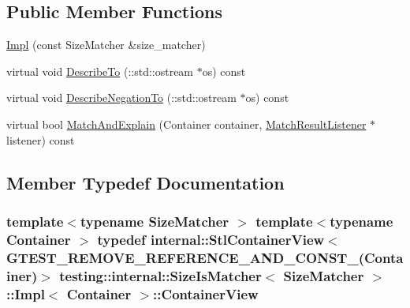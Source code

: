 \subsection*{Public Member Functions}
\begin{DoxyCompactItemize}
\item 
\hyperlink{classtesting_1_1internal_1_1SizeIsMatcher_1_1Impl_aa5279c8598ec8982546350fb442223f3}{Impl} (const Size\+Matcher \&size\+\_\+matcher)
\item 
virtual void \hyperlink{classtesting_1_1internal_1_1SizeIsMatcher_1_1Impl_a2d09318bced4fd9adf951009d81a97ff}{Describe\+To} (\+::std\+::ostream $\ast$os) const 
\item 
virtual void \hyperlink{classtesting_1_1internal_1_1SizeIsMatcher_1_1Impl_adb77690cb058ea5e2f56bb1ddcba0289}{Describe\+Negation\+To} (\+::std\+::ostream $\ast$os) const 
\item 
virtual bool \hyperlink{classtesting_1_1internal_1_1SizeIsMatcher_1_1Impl_ae68cb5cb21f7c2c0026b1afdf7e74ebf}{Match\+And\+Explain} (Container container, \hyperlink{classtesting_1_1MatchResultListener}{Match\+Result\+Listener} $\ast$listener) const 
\end{DoxyCompactItemize}


\subsection{Member Typedef Documentation}
\subsubsection[{\texorpdfstring{Container\+View}{ContainerView}}]{\setlength{\rightskip}{0pt plus 5cm}template$<$typename Size\+Matcher $>$ template$<$typename Container $>$ typedef {\bf internal\+::\+Stl\+Container\+View}$<$ {\bf G\+T\+E\+S\+T\+\_\+\+R\+E\+M\+O\+V\+E\+\_\+\+R\+E\+F\+E\+R\+E\+N\+C\+E\+\_\+\+A\+N\+D\+\_\+\+C\+O\+N\+S\+T\+\_\+}(Container)$>$ {\bf testing\+::internal\+::\+Size\+Is\+Matcher}$<$ Size\+Matcher $>$\+::{\bf Impl}$<$ Container $>$\+::{\bf Container\+View}}\hypertarget{classtesting_1_1internal_1_1SizeIsMatcher_1_1Impl_ae848755998eaaaa5e38366a2fc8b55e2}{}\label{classtesting_1_1internal_1_1SizeIsMatcher_1_1Impl_ae848755998eaaaa5e38366a2fc8b55e2}
